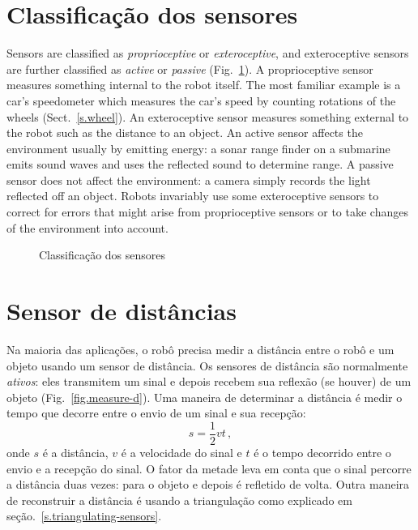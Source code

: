 \section{Classificação dos sensores}\label{s.classify}

Sensors are classified as \emph{proprioceptive} or \emph{exteroceptive}, and exteroceptive sensors are further classified as \emph{active} or \emph{passive} (Fig.~\ref{fig.sensor-classification}). A proprioceptive sensor measures something internal to the robot itself. The most familiar example is a car's speedometer which measures the car's speed by counting rotations of the wheels (Sect.~\ref{s.wheel}). An exteroceptive sensor measures something external to the robot such as the distance to an object. An active sensor affects the environment usually by emitting energy: a sonar range finder on a submarine emits sound waves and uses the reflected sound to determine range. A passive sensor does not affect the environment: a camera simply records the light reflected off an object. Robots invariably use some exteroceptive sensors to correct for errors that might arise from proprioceptive sensors or to take changes of the environment into account.

\begin{figure}
\begin{center}
\caption{Classificação dos sensores}\label{fig.sensor-classification}
\end{center}
\end{figure}

\section{Sensor de distâncias}\label{s.distance-sensors}

Na maioria das aplicações, o robô precisa medir a distância entre o robô e um objeto usando um sensor de distância. Os sensores de distância são normalmente \emph{ativos}: eles transmitem um sinal e depois recebem sua reflexão (se houver) de um objeto (Fig.~\ref{fig.measure-d}). Uma maneira de determinar a distância é medir o tempo que decorre entre o envio de um sinal e sua recepção:
\begin{equation}
s = \frac{1}{2}vt\,,\label{eq.reflected}
\end{equation}
onde $s$ é a distância, $v$ é a velocidade do sinal e $t$ é o tempo decorrido entre o envio e a recepção do sinal. O fator da metade leva em conta que o sinal percorre a distância duas vezes: para o objeto e depois é refletido de volta. Outra maneira de reconstruir a distância é usando a triangulação como explicado em seção.~\ref{s.triangulating-sensors}.

